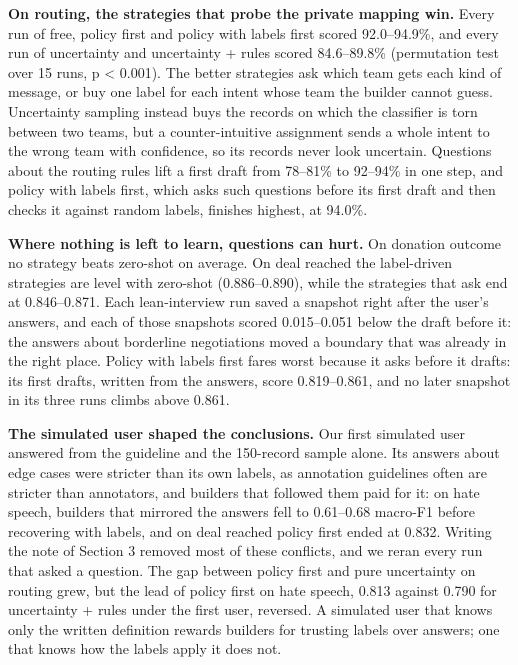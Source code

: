\documentclass[11pt]{article}
\begin{document}
\textbf{On routing, the strategies that probe the private mapping win.} Every run of free, policy first and policy with labels first scored 92.0--94.9\%, and every run of uncertainty and uncertainty + rules scored 84.6--89.8\% (permutation test over 15 runs, p < 0.001). The better strategies ask which team gets each kind of message, or buy one label for each intent whose team the builder cannot guess. Uncertainty sampling instead buys the records on which the classifier is torn between two teams, but a counter-intuitive assignment sends a whole intent to the wrong team with confidence, so its records never look uncertain. Questions about the routing rules lift a first draft from 78--81\% to 92--94\% in one step, and policy with labels first, which asks such questions before its first draft and then checks it against random labels, finishes highest, at 94.0\%.

\textbf{Where nothing is left to learn, questions can hurt.} On donation outcome no strategy beats zero-shot on average. On deal reached the label-driven strategies are level with zero-shot (0.886--0.890), while the strategies that ask end at 0.846--0.871. Each lean-interview run saved a snapshot right after the user's answers, and each of those snapshots scored 0.015--0.051 below the draft before it: the answers about borderline negotiations moved a boundary that was already in the right place. Policy with labels first fares worst because it asks before it drafts: its first drafts, written from the answers, score 0.819--0.861, and no later snapshot in its three runs climbs above 0.861.

\textbf{The simulated user shaped the conclusions.} Our first simulated user answered from the guideline and the 150-record sample alone. Its answers about edge cases were stricter than its own labels, as annotation guidelines often are stricter than annotators, and builders that followed them paid for it: on hate speech, builders that mirrored the answers fell to 0.61--0.68 macro-F1 before recovering with labels, and on deal reached policy first ended at 0.832. Writing the note of Section 3 removed most of these conflicts, and we reran every run that asked a question. The gap between policy first and pure uncertainty on routing grew, but the lead of policy first on hate speech, 0.813 against 0.790 for uncertainty + rules under the first user, reversed. A simulated user that knows only the written definition rewards builders for trusting labels over answers; one that knows how the labels apply it does not.
\end{document}
